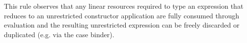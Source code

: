 \documentclass[acmsmall,review,screen]{acmart}
\newcommand{\ccase}[2]{\mathsf{case}~#1~\mathsf{of}~#2}
\begin{document}

%
This rule observes that any linear resources required to type an expression
that reduces to an unrestricted constructor application are fully consumed
through evaluation and the resulting unrestricted expression can be freely
discarded or duplicated (e.g. via the case binder).
%
%

\end{document}
